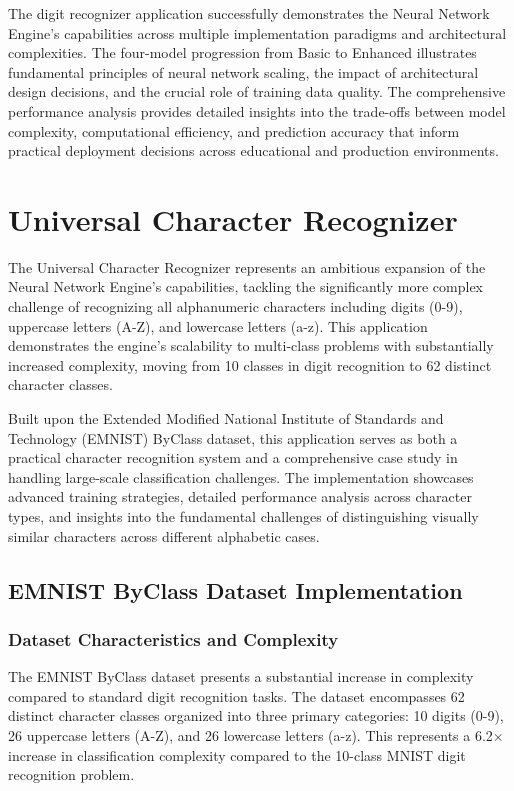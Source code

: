 \documentclass[11pt,a4paper]{report}
\begin{document}
The digit recognizer application successfully demonstrates the Neural Network Engine's capabilities across multiple implementation paradigms and architectural complexities. The four-model progression from Basic to Enhanced illustrates fundamental principles of neural network scaling, the impact of architectural design decisions, and the crucial role of training data quality. The comprehensive performance analysis provides detailed insights into the trade-offs between model complexity, computational efficiency, and prediction accuracy that inform practical deployment decisions across educational and production environments.

\section{Universal Character Recognizer}

The Universal Character Recognizer represents an ambitious expansion of the Neural Network Engine's capabilities, tackling the significantly more complex challenge of recognizing all alphanumeric characters including digits (0-9), uppercase letters (A-Z), and lowercase letters (a-z). This application demonstrates the engine's scalability to multi-class problems with substantially increased complexity, moving from 10 classes in digit recognition to 62 distinct character classes.

Built upon the Extended Modified National Institute of Standards and Technology (EMNIST) ByClass dataset, this application serves as both a practical character recognition system and a comprehensive case study in handling large-scale classification challenges. The implementation showcases advanced training strategies, detailed performance analysis across character types, and insights into the fundamental challenges of distinguishing visually similar characters across different alphabetic cases.

\subsection{EMNIST ByClass Dataset Implementation}

\subsubsection{Dataset Characteristics and Complexity}

The EMNIST ByClass dataset presents a substantial increase in complexity compared to standard digit recognition tasks. The dataset encompasses 62 distinct character classes organized into three primary categories: 10 digits (0-9), 26 uppercase letters (A-Z), and 26 lowercase letters (a-z). This represents a 6.2× increase in classification complexity compared to the 10-class MNIST digit recognition problem.
\end{document}
